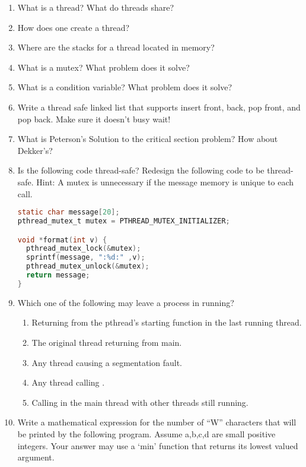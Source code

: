 \begin{enumerate}
\item What is a thread? What do threads share?
\item How does one create a thread?
\item Where are the stacks for a thread located in memory?
\item What is a mutex? What problem does it solve?
\item What is a condition variable? What problem does it solve?
\item Write a thread safe linked list that supports insert front, back, pop front, and pop back. Make sure it doesn't busy wait!
\item What is Peterson's Solution to the critical section problem? How about Dekker's?
\item Is the following code thread-safe? Redesign the following code to be thread-safe. Hint: A mutex is unnecessary if the message memory is unique to each call.

\begin{lstlisting}[language=C]
static char message[20];
pthread_mutex_t mutex = PTHREAD_MUTEX_INITIALIZER;

void *format(int v) {
  pthread_mutex_lock(&mutex);
  sprintf(message, ":%d:" ,v);
  pthread_mutex_unlock(&mutex);
  return message;
}
\end{lstlisting}

\item Which one of the following may leave a process in running?

\begin{enumerate}
\item Returning from the pthread's starting function in the last running thread.
\item The original thread returning from main.
\item Any thread causing a segmentation fault.
\item Any thread calling .
\item Calling  in the main thread with other threads still running.
\end{enumerate}

\item Write a mathematical expression for the number of ``W'' characters that will be printed by the following program. Assume a,b,c,d are small positive integers. Your answer may use a `min' function that returns its lowest valued argument.


\end{enumerate}
